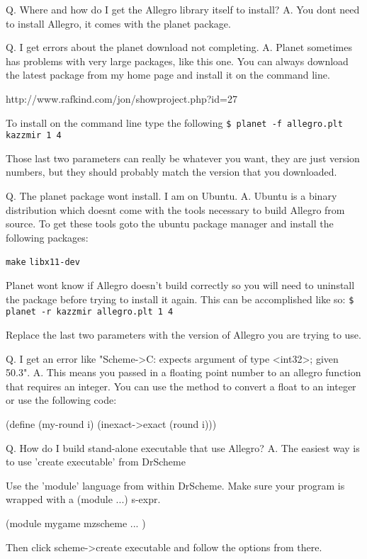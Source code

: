 Q. Where and how do I get the Allegro library itself to install?\newline
A. You dont need to install Allegro, it comes with the planet package.

Q. I get errors about the planet download not completing.\newline
A. Planet sometimes has problems with very large packages, like this one.
You can always download the latest package from my home page and install it
on the command line.

http://www.rafkind.com/jon/showproject.php?id=27

To install on the command line type the following\newline
{\tt \$ planet -f allegro.plt kazzmir 1 4}

Those last two parameters can really be whatever you want, they are just
version numbers, but they should probably match the version that you
downloaded.

Q. The planet package wont install. I am on Ubuntu.\newline
A. Ubuntu is a binary distribution which doesnt come with the tools necessary
to build Allegro from source. To get these tools goto the ubuntu package
manager and install the following packages:

  {\tt make}\newline
  {\tt libx11-dev}

Planet wont know if Allegro doesn't build correctly so you will need to
uninstall the package before trying to install it again. This can be
accomplished like so:\newline
{\tt \$ planet -r kazzmir allegro.plt 1 4}

Replace the last two parameters with the version of Allegro you are trying to
use.

Q. I get an error like "Scheme->C: expects argument of type <int32>; given 50.3".\newline
A. This means you passed in a floating point number to an allegro function that requires an integer. You can use the  method to convert a float to an integer or use the following code:

\begin{schemedisplay}
(define (my-round i)
  (inexact->exact (round i)))
\end{schemedisplay}

Q. How do I build stand-alone executable that use Allegro?\newline
A. The easiest way is to use 'create executable' from DrScheme\newline

Use the 'module' language from within DrScheme. Make sure your program is wrapped with a (module ...) s-expr.

\begin{schemedisplay}
(module mygame mzscheme
 ...
)
\end{schemedisplay}

Then click scheme->create executable and follow the options from there.
